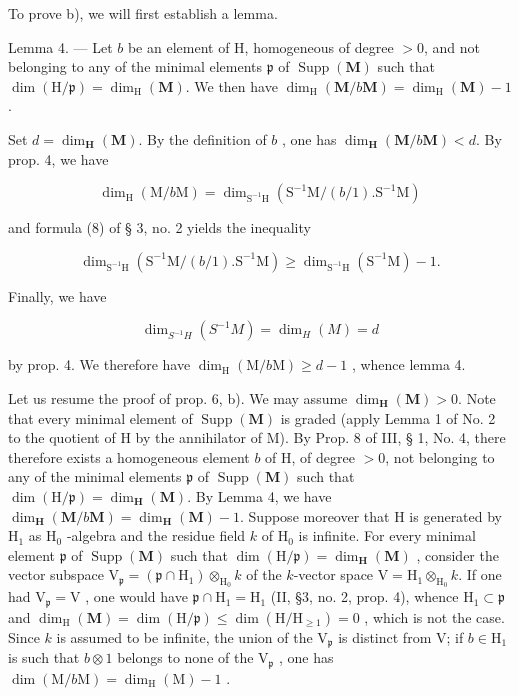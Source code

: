 To prove b), we will first establish a lemma.

Lemma 4. --- Let \(b\) be an element of H, homogeneous of degree \(>0\), and not belonging to any of the minimal elements \(\mathfrak{p}\) of \(\operatorname{Supp}(\mathbf{M})\) such that \(\dim(\mathrm{H}/\mathfrak{p}) = \dim_{\mathrm{H}}(\mathbf{M})\). We then have \(\dim_{\mathrm{H}}(\mathbf{M}/b\mathbf{M}) = \dim_{\mathrm{H}}(\mathbf{M}) - 1\).

Set \(d = \dim_{\mathbf{H}}(\mathbf{M})\). By the definition of \(b\) , one has \(\dim_{\mathbf{H}}(\mathbf{M}/b\mathbf{M}) < d\). By prop. 4, we have

\[
\dim_ {\mathrm{H}} (\mathrm{M} / b \mathrm{M}) = \dim_ {\mathrm{S} ^ {- 1} \mathrm{H}} \left(\mathrm{S} ^ {- 1} \mathrm{M} / (b / 1). \mathrm{S} ^ {- 1} \mathrm{M}\right)
\]

and formula (8) of § 3, no. 2 yields the inequality

\[
\dim_ {\mathrm{S} ^ {- 1} \mathrm{H}} (\mathrm{S} ^ {- 1} \mathrm{M} / (b / 1). \mathrm{S} ^ {- 1} \mathrm{M}) \geqslant \dim_ {\mathrm{S} ^ {- 1} \mathrm{H}} (\mathrm{S} ^ {- 1} \mathrm{M}) - 1.
\]

Finally, we have

\[
\dim_ {S ^ {- 1} H} (S ^ {- 1} M) = \dim_ {H} (M) = d
\]

by prop. 4. We therefore have \(\dim_{\mathrm{H}}(\mathrm{M}/b\mathrm{M}) \geqslant d - 1\) , whence lemma 4.

Let us resume the proof of prop. 6, b). We may assume \(\dim_{\mathbf{H}}(\mathbf{M}) > 0\). Note that every minimal element of \(\operatorname{Supp}(\mathbf{M})\) is graded (apply Lemma 1 of No. 2 to the quotient of H by the annihilator of M). By Prop. 8 of III, § 1, No. 4, there therefore exists a homogeneous element \(b\) of H, of degree \(>0\), not belonging to any of the minimal elements \(\mathfrak{p}\) of \(\operatorname{Supp}(\mathbf{M})\) such that \(\dim(\mathrm{H}/\mathfrak{p}) = \dim_{\mathbf{H}}(\mathbf{M})\). By Lemma 4, we have \(\dim_{\mathbf{H}}(\mathbf{M}/b\mathbf{M}) = \dim_{\mathbf{H}}(\mathbf{M}) - 1\). Suppose moreover that H is generated by \(\mathrm{H}_{1}\) as \(\mathrm{H}_{0}\) -algebra and the residue field \(k\) of \(\mathrm{H}_{0}\) is infinite. For every minimal element \(\mathfrak{p}\) of \(\operatorname{Supp}(\mathbf{M})\) such that \(\dim(\mathrm{H}/\mathfrak{p}) = \dim_{\mathbf{H}}(\mathbf{M})\) , consider the vector subspace \(\mathrm{V}_{\mathfrak{p}} = (\mathfrak{p} \cap \mathrm{H}_{1}) \otimes_{\mathrm{H}_{0}} k\) of the \(k\)-vector space \(\mathrm{V} = \mathrm{H}_{1} \otimes_{\mathrm{H}_{0}} k\). If one had \(\mathrm{V}_{\mathfrak{p}} = \mathrm{V}\) , one would have \(\mathfrak{p} \cap \mathrm{H}_1 = \mathrm{H}_1\) (II, §3, no. 2, prop. 4), whence \(\mathrm{H}_1 \subset \mathfrak{p}\) and \(\dim_{\mathrm{H}}(\mathbf{M}) = \dim(\mathrm{H}/\mathfrak{p}) \leqslant \dim(\mathrm{H}/\mathrm{H}_{\geqslant 1}) = 0\) , which is not the case. Since \(k\) is assumed to be infinite, the union of the \(\mathrm{V}_{\mathfrak{p}}\) is distinct from V; if \(b \in \mathrm{H}_1\) is such that \(b \otimes 1\) belongs to none of the \(\mathrm{V}_{\mathfrak{p}}\) , one has \(\dim(\mathrm{M}/b\mathrm{M}) = \dim_{\mathrm{H}}(\mathrm{M}) - 1\) .

